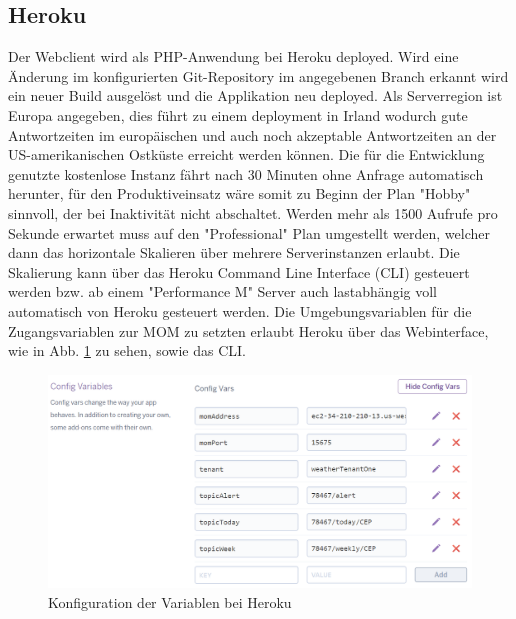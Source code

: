 \subsection{Heroku}\label{Heroku}
Der Webclient wird als PHP-Anwendung bei Heroku deployed. Wird eine Änderung im konfigurierten Git-Repository  im angegebenen Branch erkannt wird ein neuer Build ausgelöst und die Applikation neu deployed. Als Serverregion ist Europa angegeben, dies führt zu einem deployment in Irland wodurch gute Antwortzeiten im europäischen und auch noch akzeptable Antwortzeiten an der US-amerikanischen Ostküste erreicht werden können. Die für die Entwicklung genutzte kostenlose Instanz fährt nach 30 Minuten ohne Anfrage automatisch herunter, für den Produktiveinsatz wäre somit zu Beginn der Plan "Hobby" sinnvoll, der bei Inaktivität nicht abschaltet. Werden mehr als 1500 Aufrufe pro Sekunde erwartet muss auf den "Professional" Plan umgestellt werden, welcher dann das horizontale Skalieren über mehrere Serverinstanzen erlaubt. Die Skalierung kann über das Heroku Command Line Interface (CLI) gesteuert werden bzw. ab einem "Performance M" Server auch lastabhängig voll automatisch von Heroku gesteuert werden. Die Umgebungsvariablen für die Zugangsvariablen zur MOM zu setzten erlaubt Heroku über das Webinterface, wie in Abb. \ref{img:herokuConf} zu sehen, sowie das CLI.
\begin{figure}[htbp]
	\centering
	\includegraphics[width=1.0\textwidth]{Bilder/Web-herokuEnv.PNG}
	\caption{Konfiguration der Variablen bei Heroku}
	\label{img:herokuConf}
\end{figure} 


